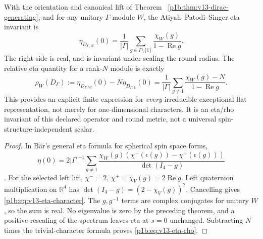 \documentclass[11pt]{article}
\begin{document}
\begin{theorem}
\label{p1b:thm:v13-eta-character}
With the orientation and canonical lift of Theorem~
\ref{p1b:thm:v13-dirac-generating}, and for any unitary
$\Gamma$-module $W$, the Atiyah--Patodi--Singer eta invariant is
\begin{equation}
\label{p1b:eq:v13-eta-character}
 \boxed{\eta_{D_{\Gamma,W}}(0)
   =\frac1{|\Gamma|}\sum_{g\in\Gamma\setminus\{1\}}
      \frac{\chi_W(g)}{1-\operatorname{Re}g}.}
\end{equation}
The right side is real, and is invariant under scaling the round
radius. The relative eta quantity for a rank-$N$ module is exactly
\begin{equation}
\label{p1b:eq:v13-eta-rho}
 \rho_W(D_\Gamma)
 :=\eta_{D_{\Gamma,W}}(0)-N\eta_{D_{\Gamma,\mathbf1}}(0)
 =\frac1{|\Gamma|}\sum_{g\ne1}
   \frac{\chi_W(g)-N}{1-\operatorname{Re}g}.
\end{equation}
This provides an explicit finite expression for \emph{every}
irreducible exceptional flat representation, not merely for one-dimensional
characters.  It is an eta/rho invariant of this declared operator and
round metric, not a universal spin-structure-independent scalar.
\end{theorem}
\begin{proof}
In B\"ar's general eta formula for spherical spin space forms,
\[
 \eta(0)=2|\Gamma|^{-1}\sum_{g\ne1}
 \frac{\chi_W(g)(\chi^-(\epsilon(g))-\chi^+(\epsilon(g)))}{\det(I_4-g)}
\]
\cite{Baer2000SpinStructure,
BaerSchopka2003DiracDeterminant}.  For the selected left lift,
$\chi^-=2$, $\chi^+=\chi_V(g)=2\operatorname{Re}g$.
Left quaternion multiplication on $\mathbb R^4$ has
$\det(I_4-g)=(2-\chi_V(g))^2$.  Cancelling gives
\eqref{p1b:eq:v13-eta-character}.  The $g,g^{-1}$ terms are
complex conjugates for unitary $W$, so the sum is real.
No eigenvalue is zero by the preceding theorem, and a positive
rescaling of the spectrum leaves eta at $s=0$ unchanged.
Subtracting $N$ times the trivial-character formula proves
\eqref{p1b:eq:v13-eta-rho}.
\end{proof}
\end{document}
